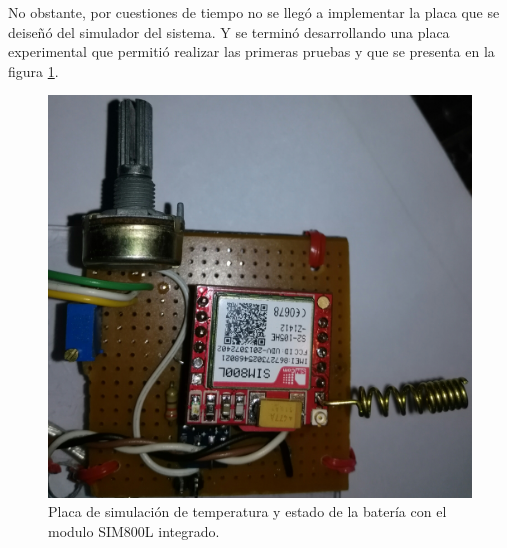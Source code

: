 No obstante, por cuestiones de tiempo no se llegó a implementar la placa que se deiseñó del simulador del sistema. Y se terminó desarrollando una placa experimental que permitió realizar las primeras pruebas y que se presenta en la figura \ref{fig:placa_básicafirst}.

\begin{figure}[!ht]
  \centering
  \includegraphics[scale=.07]{./Figures/placa_basica.jpg}
  \caption{Placa de simulación de temperatura y estado de la batería con el modulo SIM800L integrado.}
  \label{fig:placa_básicafirst}
\end{figure}


%




